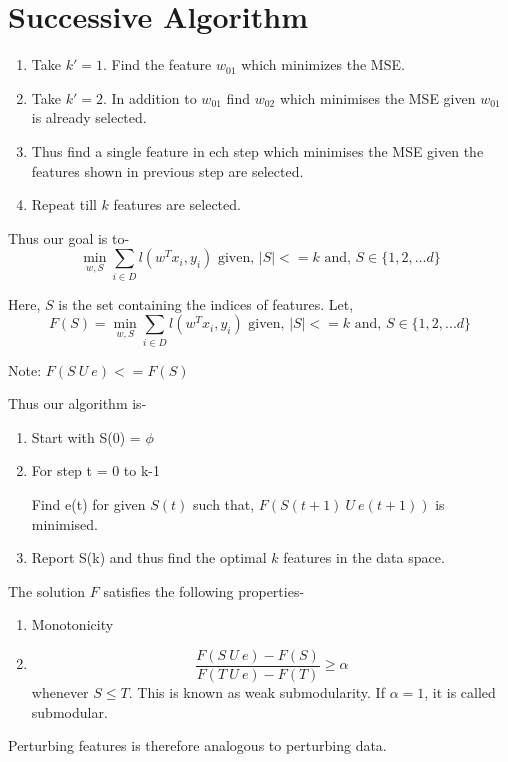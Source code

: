\documentclass[11pt, twosides]{article}
\begin{document}
\section{Successive Algorithm}
\begin{enumerate}
    \item Take $k' = 1$. Find the feature $w_{01}$ which minimizes the MSE.
    \item Take $k' = 2$. In addition to $w_{01}$ find $w_{02}$ which minimises the MSE given $w_{01}$ is already selected.
    \item Thus find a single feature in ech step which minimises the MSE given the features shown in previous step are selected.
    \item Repeat till $k$ features are selected.
\end{enumerate}

Thus our goal is to-
$$ \min_{w, S} \sum_{i\in D} l(w^Tx_i, y_i) \text{ \ \ \ given, \ \ \ } |S|<=k \text{ \ and, \ } S\in \{1,2,...d\}$$


Here, $S$ is the set containing the indices of features.
Let,
$$F(S) = \min_{w, S} \sum_{i\in D} l(w^Tx_i, y_i) \text{ \ \ \ given, \ \ \ } |S|<=k \text{ \ and, \ } S\in \{1,2,...d\}$$

Note: $F(S \ U \ e) <= F(S)$

Thus our algorithm is-
\begin{enumerate}
    \item Start with S(0) = $\phi$
    \item For step t = 0 to k-1
    \begin{enumerate}
         Find e(t) for given $S(t)$ such that, $F(S(t+1) \ U \ e(t+1))$ is minimised.
    \end{enumerate}
    \item Report S(k) and thus find the optimal $k$ features in the data space.
\end{enumerate}

The solution $F$ satisfies the following properties-
\begin{enumerate}
    \item Monotonicity
    \item $$\frac{F(S \ U \ e) - F(S)}{F(T \ U \ e) - F(T)} \geq \alpha$$ whenever $S \leq T$. This is known as weak submodularity. If $\alpha = 1$, it is called submodular.
\end{enumerate}
Perturbing features is therefore analogous to perturbing data.
\end{document}
